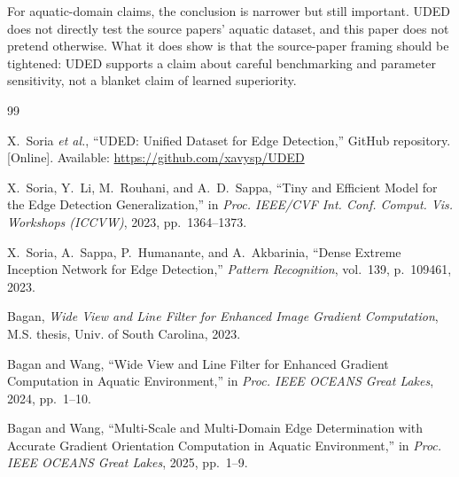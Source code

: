 \documentclass[conference]{IEEEtran}
\begin{document}
For aquatic-domain claims, the conclusion is narrower but still important. UDED does not directly test the source papers' aquatic dataset, and this paper does not pretend otherwise. What it does show is that the source-paper framing should be tightened: UDED supports a claim about careful benchmarking and parameter sensitivity, not a blanket claim of learned superiority.

\begin{thebibliography}{99}

X.~Soria \emph{et al.}, ``UDED: Unified Dataset for Edge Detection,'' GitHub repository. [Online]. Available: \url{https://github.com/xavysp/UDED}

X.~Soria, Y.~Li, M.~Rouhani, and A.~D.~Sappa, ``Tiny and Efficient Model for the Edge Detection Generalization,'' in \emph{Proc. IEEE/CVF Int. Conf. Comput. Vis. Workshops (ICCVW)}, 2023, pp.~1364--1373.

X.~Soria, A.~Sappa, P.~Humanante, and A.~Akbarinia, ``Dense Extreme Inception Network for Edge Detection,'' \emph{Pattern Recognition}, vol.~139, p.~109461, 2023.

Bagan, \emph{Wide View and Line Filter for Enhanced Image Gradient Computation}, M.S. thesis, Univ. of South Carolina, 2023.

Bagan and Wang, ``Wide View and Line Filter for Enhanced Gradient Computation in Aquatic Environment,'' in \emph{Proc. IEEE OCEANS Great Lakes}, 2024, pp.~1--10.

Bagan and Wang, ``Multi-Scale and Multi-Domain Edge Determination with Accurate Gradient Orientation Computation in Aquatic Environment,'' in \emph{Proc. IEEE OCEANS Great Lakes}, 2025, pp.~1--9.

\end{thebibliography}
\end{document}
